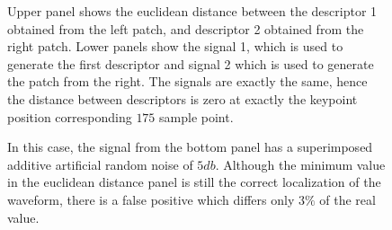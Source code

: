 \begin{figure}[h!]
\centering
{}
\caption[Waveform identification Scheme]{Upper panel shows the euclidean distance between the descriptor 1 obtained from the left patch, and descriptor 2 obtained from the right patch.  Lower panels show the signal 1, which is used to generate the first descriptor and signal 2 which is used to generate the patch from the right.  The signals are exactly the same, hence the distance between descriptors is zero at exactly the keypoint position corresponding $175$ sample point.}
\label{fig:dialdescriptors1}
\end{figure}


\begin{figure}[h!]
\centering
{}
\caption[Waveform identification under the presence of noisy signals]{In this case, the signal from the bottom panel has a superimposed additive artificial random noise of $5 \si{db}$.  Although the minimum value in the euclidean distance panel is still the correct localization of the waveform, there is a false positive which differs only $3\%$ of the real value. }
\label{fig:dialdescriptors2}
\end{figure}


